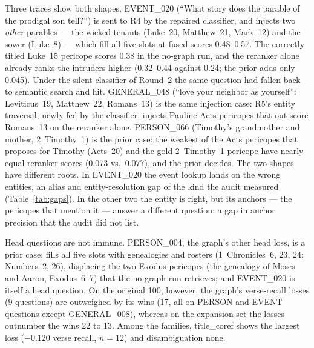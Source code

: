 Three traces show both shapes. EVENT\_020 (``What story does the parable
of the prodigal son tell?'') is sent to R4 by the repaired classifier,
and  injects two \emph{other} parables --- the wicked
tenants (Luke~20, Matthew~21, Mark~12) and the sower (Luke~8) --- which
fill all five slots at fused scores 0.48--0.57. The correctly titled
Luke~15 pericope scores 0.38 in the no-graph run, and the reranker alone
already ranks the intruders higher (0.32--0.44 against 0.24; the prior
adds only 0.045). Under the silent classifier of Round~2 the same
question had fallen back to semantic search and hit. GENERAL\_048 (``love
your neighbor as yourself'': Leviticus~19, Matthew~22, Romans~13) is the
same injection case: R5's entity traversal, newly fed by the classifier,
injects Pauline Acts pericopes that out-score Romans~13 on the reranker
alone. PERSON\_066 (Timothy's grandmother and mother, 2~Timothy~1) is the
prior case: the weakest of the Acts pericopes that 
proposes for Timothy (Acts~20) and the gold 2~Timothy~1 pericope have
nearly equal reranker scores (0.073 vs.\ 0.077), and the prior
decides. The two shapes have different
roots. In EVENT\_020 the event lookup lands on the wrong entities, an
alias and entity-resolution gap of the kind the audit measured
(Table~\ref{tab:gaps}). In the other two the entity is right, but its
anchors --- the pericopes that mention it --- answer a different
question: a gap in anchor precision that the audit did not list.

Head questions are not immune. PERSON\_004, the graph's other head loss,
is a prior case:  fills all five slots with
genealogies and rosters (1~Chronicles~6, 23, 24; Numbers~2, 26),
displacing the two Exodus pericopes (the genealogy of Moses and Aaron,
Exodus~6--7) that the no-graph run retrieves; and EVENT\_020 is itself a
head question. On the original 100, however, the graph's verse-recall
losses (9 questions) are outweighed by its wins (17, all on PERSON and
EVENT questions except GENERAL\_008), whereas on the expansion set the
losses outnumber the wins 22 to 13. Among the families, title\_coref
shows the largest loss ($-0.120$ verse recall, $n=12$) and
disambiguation none.

